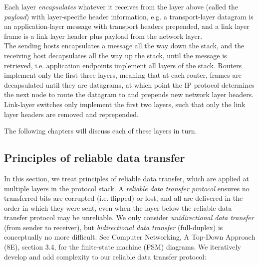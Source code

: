\documentclass[8pt, table, xcdraw]{article}%
\begin{document}
Each layer \emph{encapsulates} whatever it receives from the layer above (called the \emph{payload}) with layer-specific header information, e.g. a transport-layer datagram is an application-layer message with transport headers prepended, and a link layer frame is a link layer header plus payload from the network layer.\\
The sending hosts encapsulates a message all the way down the stack, and the receiving host decapsulates all the way up the stack, until the message is retrieved, i.e. application endpoints implement all layers of the stack. Routers implement only the first three layers, meaning that at each router, frames are decapsulated until they are datagrams, at which point the IP protocol determines the next node to route the datagram to and prepends new network layer headers. Link-layer switches only implement the first two layers, such that only the link layer headers are removed and reprepended.

The following chapters will discuss each of these layers in turn.

\subsection{Principles of reliable data transfer} \label{reliabledatatransfer}

In this section, we treat principles of reliable data transfer, which are applied at multiple layers in the protocol stack. A \emph{reliable data transfer protocol} ensures no transferred bits are corrupted (i.e. flipped) or lost, and all are delivered in the order in which they were sent, even when the layer below the reliable data transfer protocol may be unreliable. We only consider \emph{unidirectional data transfer} (from sender to receiver), but \emph{bidirectional data transfer} (full-duplex) is conceptually no more difficult. See Computer Networking, A Top-Down Approach (8E), section 3.4, for the finite-state machine (FSM) diagrams. We iteratively develop and add complexity to our reliable data transfer protocol:
\end{document}
